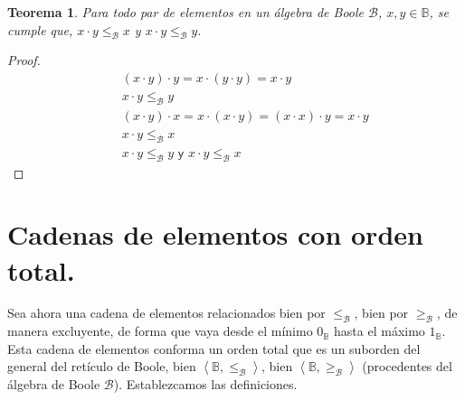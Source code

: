 \documentclass[final,12pt,a4paper,twoside,fleqn]{extbook}
\newcommand{\set}[1]{\ensuremath{\left\lbrace{#1}\right\rbrace}}
\newcommand{\setB}{\ensuremath{\mathbb{B}}}
\newcommand{\algB}{\ensuremath{\mathscr{B}}}
\newcommand{\leqB}{\ensuremath{{\leq}_{\algB}}}
\newcommand{\geqB}{\ensuremath{{\geq}_{\algB}}}
\newtheorem{thm}{Teorema}[chapter]
\theoremstyle{definition}
\theoremstyle{remark}
\begin{document}
\begin{thm}
Para todo par de elementos en un álgebra de Boole \( \algB \), \( x , y \in
\setB \), se cumple que, \( x \cdot y \leqB x \) y \( x \cdot y \leqB y \).
\end{thm}



\begin{proof}
\begin{eqnarray}
&& (x \cdot y) \cdot y = x \cdot (y \cdot y) = x \cdot y\\
&& x \cdot y \leqB y\\
&& (x \cdot y) \cdot x = x \cdot (x \cdot y) = (x \cdot x) \cdot y = x \cdot
y\\
&& x \cdot y \leqB x\\
&& x \cdot y \leqB y \textsf{  y  } x \cdot y \leqB x
\end{eqnarray}
\end{proof}



\section{Cadenas de elementos con orden total.}



	Sea ahora una cadena de elementos relacionados bien por \(\leqB\), bien
por \(\geqB\), de manera excluyente, de forma que vaya desde el mínimo
\(0_{\setB}\) hasta el máximo \(1_{\setB}\). Esta cadena de elementos
conforma un orden total que es un suborden del general del retículo de Boole,
bien \(\left\langle \setB , \leqB \right\rangle\), bien  \(\left\langle \setB
, \geqB \right\rangle\) (procedentes del álgebra de Boole \(\algB\)).
Establezcamos las definiciones.



\newcommand{\PartesDeSinVacio}[1]{\ensuremath{\mathscr{P}\left(#1\right)\setminus{\set{\emptyset}}}}
\newcommand{\PartesDe}[1]{\ensuremath{\mathscr{P}\left(#1\right)}}
\newcommand{\EsCadena}[2]{\ensuremath{\mathsf{Chain}_{#1}\left(#2\right)}}
\newcommand{\EsCadenaSat}[2]{\ensuremath{\mathsf{SChain}_{#1}\left(#2\right)}}
\newcommand{\EsCadenaDisc}[2]{\ensuremath{\mathsf{DChain}_{#1}\left(#2\right)}}
\newcommand{\EsCadenaAsc}[2]{\ensuremath{\mathscr{AC}_{#1}\left(#2\right)}}
\newcommand{\EsCadenaDesc}[2]{\ensuremath{\mathscr{DC}_{#1}\left(#2\right)}}
\newcommand{\EsCadenaAscSat}[2]{\ensuremath{\mathscr{SAC}_{#1}\left(#2\right)}}
\newcommand{\EsCadenaDescSat}[2]{\ensuremath{\mathscr{SDC}_{#1}\left(#2\right)}}
\end{document}
